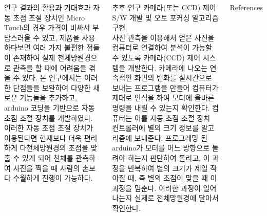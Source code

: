\documentclass{gshs_poster_beamer}
\begin{document}
\begin{columns}[T]
\begin{posterbox}[colbacktitle=purple,coltitle=white,colback=purple!5]{연구 결과의 활용과 기대효과}
자동 초점 조절 장치인 Micro Touch의 경우 가격이 비싸서 부담스러울 수 있고, 제품을 사용하다보면 여러 가지 불편한 점들이 존재하여 실제 천체망원경으로 관측을 할 때에 어려움을 겪을 수 있다. 본 연구에서는 이러한 단점들을 보완하여 다양한 새로운 기능들을 추가하고, arduino 코딩을 기반으로 자동 초점 조절 장치를 개발하였다. 이러한 자동 초점 조절 장치가 이용된다면 현재보다 더욱 편리하게 다천체망원경의 초점을 맞출 수 있게 되어 천체를 관측하여 사진을 찍을 때 사람의 손보다 수월하게 진행이 가능하다.
\end{posterbox}

\vspace{1em}

\begin{posterbox}[colbacktitle=brown,coltitle=white,colback=brown!5]{추후 연구}
	카메라(또는 CCD) 제어 S/W 개발 및 오토 포커싱 알고리즘 구현\\
	사진 관측을 이용해서 얻은 사진을 컴퓨터로 연결하여 분석이 가능할 수 있도록 카메라(CCD) 제어 시스템을 개발한다. 카메라에 나오는 연속적인 화면의 변화를 실시간으로 보내는 프로그램을 만들어 컴퓨터가 제대로 인식을 하여 모터에 올바른 명령을 내릴 수 있는지 확인한다. 컴퓨터는 이를 자동 초점 조절 장치 컨트롤러에 별의 크기 정보를 알고리즘에 보내준다. 프로그래밍 된 arduino가 모터를 어느 방향으로 돌려야 하는지 판단하여 돌리고, 이 과정을 반복하여 별의 크기가 제일 작아질 때, 즉 별의 초점이 맞을 때 이 과정을 멈춘다. 이러한 과정이 일어나는지 실제로 천체망원경에 달아서 확인한다.
\end{posterbox}

\vspace{1em}

\begin{posterbox}[colbacktitle=yellow,coltitle=black,colback=yellow!5]{References}
	

\end{posterbox}



\end{columns}
\end{document}
